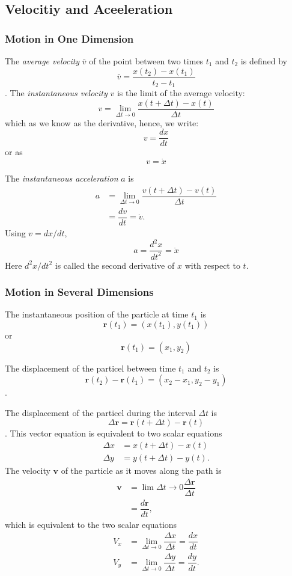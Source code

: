 \documentclass{article}
\begin{document}
{\newpage
\subsection{Velocitiy and Aceeleration}
\subsubsection{Motion in One Dimension}
The \emph{average velocity} $\bar{v}$ of the point between two times $t_1$ and
$t_2$ is defined by 
\[\bar{v} = \dfrac{x(t_2)-x(t_1)}{t_2-t_1}\].
The \emph{instantaneous velocity} $v$ is the limit of the average velocity:
\[v = \lim_{\Delta t \to 0} \dfrac{x(t+\Delta t)-x(t)}{\Delta t}\]
which as we know as the derivative, hence, we write:
\[v = \dfrac{dx}{dt}\]
or as
\[v = \dot{x}\]

The \emph{instantaneous acceleration} $a$ is 
\begin{align*}
    a &= \lim_{\Delta t \to 0} \dfrac{v(t + \Delta t)-v(t)}{\Delta t}\\
    &= \dfrac{dv}{dt} = \dot{v}.
\end{align*}
Using $v = dx/dt$, 
\[a =\dfrac{d^2x}{dt^2} = \ddot{x}\]
Here $d^2x/dt^2$ is called the second derivative of $x$ with respect to $t$.

\subsubsection{Motion in Several Dimensions}
The instantaneous position of the particle at time $t_1$ is 
\[\mathbf{r}(t_1) = (x(t_1),y(t_1))\]
or 
\[ \mathbf{r}(t_1) = (x_1,y_2)\]

The displacement of the particel between time $t_1$ and $t_2$ is 
\[\mathbf{r}(t_2)-\mathbf{r}(t_1) = (x_2-x_1, y_2-y_1)\].

The displacement of the particel during the interval $\Delta t$ is 
\[\Delta \mathbf{r} = \mathbf{r}(t + \Delta t) - \mathbf{r}(t)\].
This vector equation is equivalent  to two scalar equations
\begin{align*}
    \Delta x &= x(t+\Delta t)-x(t) \\
    \Delta y &= y(t+ \Delta t) -y(t).
\end{align*}
The velocity $\mathbf{v}$ of the particle as it moves along the path is 
\begin{align*}
    \mathbf{v} &= \lim{\Delta t \to 0} \dfrac{\Delta \mathbf{r}}{\Delta t} \\
    &=  \dfrac{d \mathbf{r}}{dt},
\end{align*}
which is equivalent to the two scalar equations
\begin{align*}
    V_x &= \lim_{\Delta t \to 0} \dfrac{\Delta x}{\Delta t} = \dfrac{dx}{dt} \\[1.25ex]
    V_y &= \lim_{\Delta t \to 0} \dfrac{\Delta y}{ \Delta t} = \dfrac{dy}{dt}.
\end{align*}

}
\end{document}
